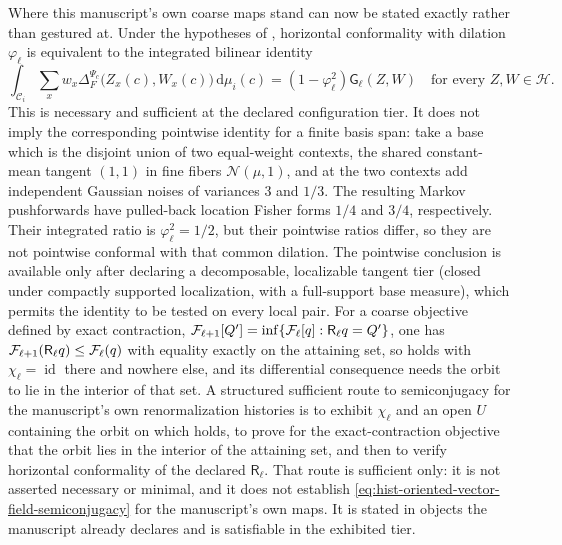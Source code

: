 Where this manuscript's own coarse maps stand can now be stated exactly rather
than gestured at.  Under the hypotheses of
, horizontal conformality with
dilation $\varphi_\ell$ is equivalent to the integrated bilinear identity
\begin{equation}
\int_{\mathcal C_i}\sum_xw_x
\Delta_F^{\Psi_c}\bigl(Z_x(c),W_x(c)\bigr)\,\mathrm d\mu_i(c)
=(1-\varphi_\ell^2)\mathsf G_\ell(Z,W)
\quad\text{for every }Z,W\in\mathcal H.
\label{eq:hist-integrated-conformality-criterion}
\end{equation}
This is necessary and sufficient at the declared configuration tier.  It does
not imply the corresponding pointwise identity for a finite basis span: take a
base which is the disjoint union of two equal-weight contexts, the shared
constant-mean tangent $(1,1)$ in fine fibers $\mathcal N(\mu,1)$, and at the
two contexts add independent Gaussian noises of variances $3$ and $1/3$.
The resulting Markov pushforwards have pulled-back location Fisher forms
$1/4$ and $3/4$, respectively.  Their integrated ratio is
$\varphi_\ell^2=1/2$, but their pointwise ratios differ, so they are not
pointwise conformal with that common dilation.
The pointwise conclusion is available only after declaring a decomposable,
localizable tangent tier (closed under compactly supported localization, with a
full-support base measure), which permits the identity to be tested on every
local pair.  For a coarse objective defined
by exact contraction,
$\mathcal F_{\ell+1}[Q']=\inf\{\mathcal F_\ell[q]:\mathsf R_\ell q=Q'\}$, one has
$\mathcal F_{\ell+1}(\mathsf R_\ell q)\leq\mathcal F_\ell(q)$ with equality exactly
on the attaining set, so
 holds with
$\chi_\ell=\operatorname{id}$ there and nowhere else, and its differential
consequence needs the orbit to lie in the interior of that set.  A structured
sufficient route to semiconjugacy for the manuscript's own renormalization histories is to
exhibit $\chi_\ell$ and an open $U$ containing the orbit on which
 holds, to prove for the exact-contraction
objective that the orbit lies in the interior of the attaining set, and then to
verify horizontal conformality of the declared $\mathsf R_\ell$.  That
route is sufficient only: it is not asserted necessary or minimal, and it does
not establish \eqref{eq:hist-oriented-vector-field-semiconjugacy} for the
manuscript's own maps.  It is stated in objects the manuscript already
declares and is satisfiable in the exhibited tier.  

